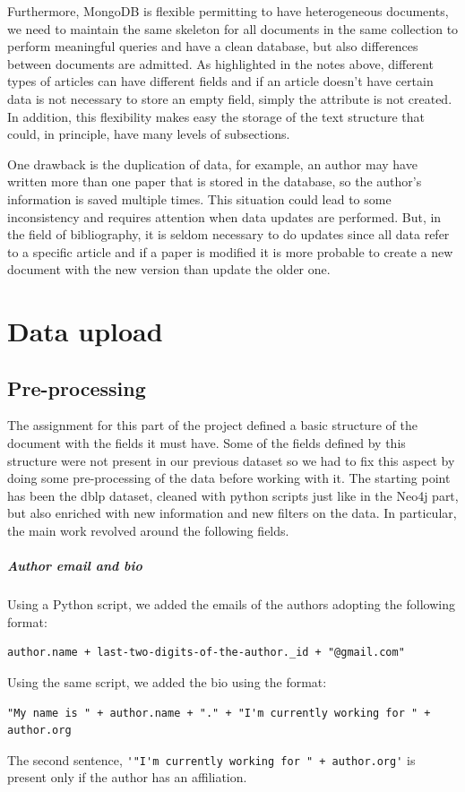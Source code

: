 Furthermore, MongoDB is flexible permitting to have heterogeneous documents, we need to maintain the same skeleton for all documents in the same collection to perform meaningful queries and have a clean database, but also differences between documents are admitted.
As highlighted in the notes above, different types of articles can have different fields and if an article doesn't have certain data is not necessary to store an empty field, simply the attribute is not created.
In addition, this flexibility makes easy the storage of the text structure that could, in principle, have many levels of subsections.

One drawback is the duplication of data, for example, an author may have written more than one paper that is stored in the database, so the author's information is saved multiple times.
This situation could lead to some inconsistency and requires attention when data updates are performed.
But, in the field of bibliography, it is seldom necessary to do updates since all data refer to a specific article and if a paper is modified it is more probable to create a new document with the new version than update the older one.


\chapter{Data upload}
\label{ch:data_upload_mongodb}%


\section{Pre-processing}
\label{sec:pre_processing_mongodb}%
The assignment for this part of the project defined a basic structure of the document with the fields it must have.
Some of the fields defined by this structure were not present in our previous dataset so we had to fix this aspect by doing some pre-processing of the data before working with it.
The starting point has been the dblp dataset, cleaned with python scripts just like in the Neo4j part, but also enriched with new information and new filters on the data.
In particular, the main work revolved around the following fields.

\paragraph{Author email and bio}
Using a Python script, we added the emails of the authors adopting the following format:
\begin{lstlisting}[label={lst:author_email}]
author.name + last-two-digits-of-the-author._id + "@gmail.com"
\end{lstlisting}
Using the same script, we added the bio using the format:
\begin{lstlisting}[label={lst:author_bio}]
"My name is " + author.name + "." + "I'm currently working for " + author.org
\end{lstlisting}
The second sentence, \verb|'"I'm currently working for " + author.org'| is present only if the author has an affiliation.


